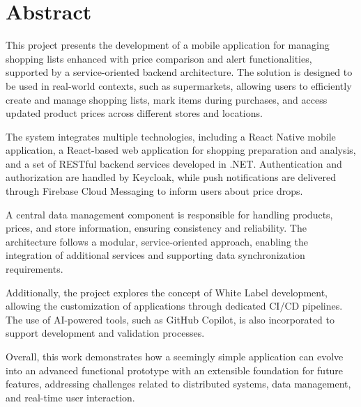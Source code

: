 \chapter{Abstract}

This project presents the development of a mobile application for managing shopping lists enhanced with price comparison and alert functionalities, supported by a service-oriented backend architecture. The solution is designed to be used in real-world contexts, such as supermarkets, allowing users to efficiently create and manage shopping lists, mark items during purchases, and access updated product prices across different stores and locations.

The system integrates multiple technologies, including a React Native mobile application, a React-based web application for shopping preparation and analysis, and a set of RESTful backend services developed in .NET. Authentication and authorization are handled by Keycloak, while push notifications are delivered through Firebase Cloud Messaging to inform users about price drops.

A central data management component is responsible for handling products, prices, and store information, ensuring consistency and reliability. The architecture follows a modular, service-oriented approach, enabling the integration of additional services and supporting data synchronization requirements.

Additionally, the project explores the concept of White Label development, allowing the customization of applications through dedicated CI/CD pipelines. The use of AI-powered tools, such as GitHub Copilot, is also incorporated to support development and validation processes.

Overall, this work demonstrates how a seemingly simple application can evolve into an advanced functional prototype with an extensible foundation for future features, addressing challenges related to distributed systems, data management, and real-time user interaction.
